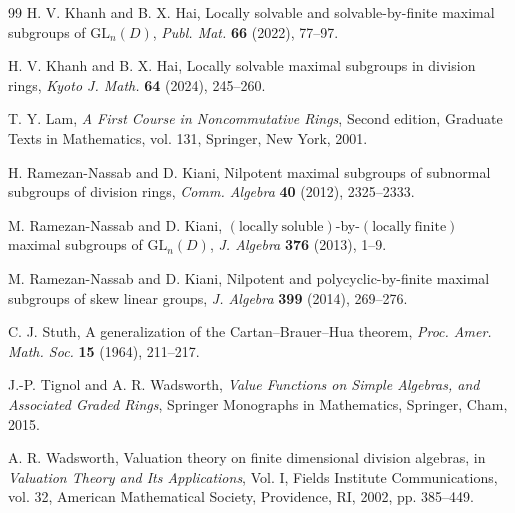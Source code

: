 \documentclass[11pt]{amsart}
\theoremstyle{definition}
\begin{document}
\begin{thebibliography}{99}
H. V. Khanh and B. X. Hai,
Locally solvable and solvable-by-finite maximal subgroups of
\(\mathrm{GL}_n(D)\),
\emph{Publ. Mat.} \textbf{66} (2022), 77--97.

H. V. Khanh and B. X. Hai,
Locally solvable maximal subgroups in division rings,
\emph{Kyoto J. Math.} \textbf{64} (2024), 245--260.

T. Y. Lam,
\emph{A First Course in Noncommutative Rings},
Second edition,
Graduate Texts in Mathematics, vol. 131,
Springer, New York, 2001.

H. Ramezan-Nassab and D. Kiani,
Nilpotent maximal subgroups of subnormal subgroups of division rings,
\emph{Comm. Algebra} \textbf{40} (2012), 2325--2333.

M. Ramezan-Nassab and D. Kiani,
\((\mathrm{locally}\ \mathrm{soluble})\)-by-\((\mathrm{locally}\ \mathrm{finite})\)
maximal subgroups of \(\mathrm{GL}_n(D)\),
\emph{J. Algebra} \textbf{376} (2013), 1--9.

M. Ramezan-Nassab and D. Kiani,
Nilpotent and polycyclic-by-finite maximal subgroups of skew linear groups,
\emph{J. Algebra} \textbf{399} (2014), 269--276.

C. J. Stuth,
A generalization of the Cartan--Brauer--Hua theorem,
\emph{Proc. Amer. Math. Soc.} \textbf{15} (1964), 211--217.

J.-P. Tignol and A. R. Wadsworth,
\emph{Value Functions on Simple Algebras, and Associated Graded Rings},
Springer Monographs in Mathematics,
Springer, Cham, 2015.

A. R. Wadsworth,
Valuation theory on finite dimensional division algebras,
in \emph{Valuation Theory and Its Applications}, Vol. I,
Fields Institute Communications, vol. 32,
American Mathematical Society, Providence, RI, 2002, pp. 385--449.

\end{thebibliography}
\end{document}
